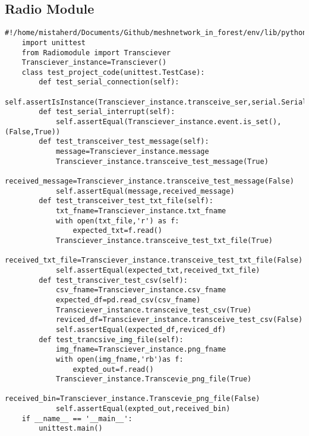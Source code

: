 \subsection{Radio Module}
\begin{lstlisting}[style=mystyle,caption={unit test code for Radio module}]
    #!/home/mistaherd/Documents/Github/meshnetwork_in_forest/env/lib/python3.11
    import unittest
    from Radiomodule import Transciever
    Transciever_instance=Transciever()
    class test_project_code(unittest.TestCase):
        def test_serial_connection(self):
            self.assertIsInstance(Transciever_instance.transceive_ser,serial.Serial)
        def test_serial_interrupt(self):
            self.assertEqual(Transciever_instance.event.is_set(),(False,True))
        def test_transceiver_test_message(self):
            message=Transciever_instance.message
            Transciever_instance.transceive_test_message(True)
            received_message=Transciever_instance.transceive_test_message(False)
            self.assertEqual(message,received_message)
        def test_transceiver_test_txt_file(self):
            txt_fname=Transciever_instance.txt_fname
            with open(txt_file,'r') as f:
                expected_txt=f.read()
            Transciever_instance.transceive_test_txt_file(True)
            received_txt_file=Transciever_instance.transceive_test_txt_file(False)
            self.assertEqual(expected_txt,received_txt_file)
        def test_transciver_test_csv(self):
            csv_fname=Transciever_instance.csv_fname
            expected_df=pd.read_csv(csv_fname)
            Transciever_instance.transceive_test_csv(True)
            reviced_df=Transciever_instance.transceive_test_csv(False)
            self.assertEqual(expected_df,reviced_df)
        def test_trancsive_img_file(self):
            img_fname=Transciever_instance.png_fname
            with open(img_fname,'rb')as f:
                expted_out=f.read()
            Transciever_instance.Transcevie_png_file(True)
            received_bin=Transciever_instance.Transcevie_png_file(False)
            self.assertEqual(expted_out,received_bin)
    if __name__ == '__main__':
        unittest.main()
\end{lstlisting}